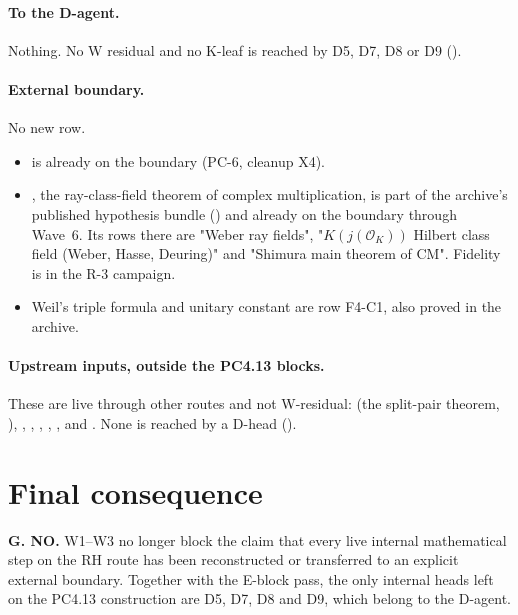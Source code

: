 \documentclass[11pt]{article}
\theoremstyle{remark}
\begin{document}
\paragraph{To the D-agent.} Nothing. No W residual and no K-leaf is reached by D5, D7, D8 or D9 ().

\paragraph{External boundary.} No new row.
\begin{itemize}[leftmargin=*,itemsep=1pt]
\item {} is already on the boundary (PC-6, cleanup X4).
\item {}, the ray-class-field theorem of complex multiplication, is part of the archive's published hypothesis bundle () and already on the boundary through Wave~6. Its rows there are "Weber ray fields", "$K(j(\mathcal O_K))$ Hilbert class field (Weber, Hasse, Deuring)" and "Shimura main theorem of CM". Fidelity is in the R-3 campaign.
\item Weil's triple formula and unitary constant are row F4-C1, also proved in the archive.
\end{itemize}

\paragraph{Upstream inputs, outside the PC4.13 blocks.} These are live through other routes and not W-residual:  (the split-pair theorem, ), , , , , ,  and . None is reached by a D-head ().

\section{Final consequence}\label{sec:final}

\textbf{G. NO.} W1--W3 no longer block the claim that every live internal mathematical step on the RH route has been reconstructed or transferred to an explicit external boundary. Together with the E-block pass, the only internal heads left on the PC4.13 construction are D5, D7, D8 and D9, which belong to the D-agent.
\end{document}
